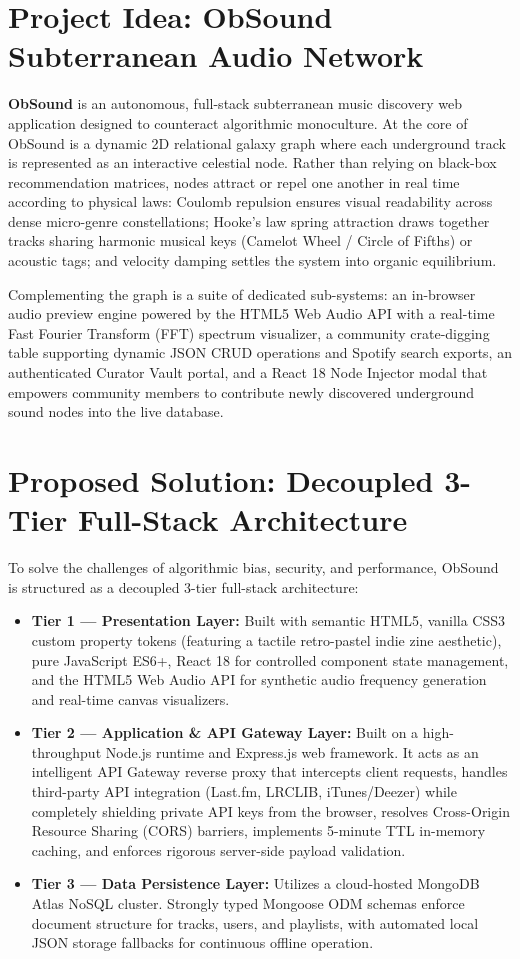 \documentclass[12pt,a4paper,oneside]{report}
\begin{document}
\section{Project Idea: ObSound Subterranean Audio Network}
\textbf{ObSound} is an autonomous, full-stack subterranean music discovery web application designed to counteract algorithmic monoculture. At the core of ObSound is a dynamic 2D relational galaxy graph where each underground track is represented as an interactive celestial node. Rather than relying on black-box recommendation matrices, nodes attract or repel one another in real time according to physical laws: Coulomb repulsion ensures visual readability across dense micro-genre constellations; Hooke's law spring attraction draws together tracks sharing harmonic musical keys (Camelot Wheel / Circle of Fifths) or acoustic tags; and velocity damping settles the system into organic equilibrium.

Complementing the graph is a suite of dedicated sub-systems: an in-browser audio preview engine powered by the HTML5 Web Audio API with a real-time Fast Fourier Transform (FFT) spectrum visualizer, a community crate-digging table supporting dynamic JSON CRUD operations and Spotify search exports, an authenticated Curator Vault portal, and a React 18 Node Injector modal that empowers community members to contribute newly discovered underground sound nodes into the live database.

\section{Proposed Solution: Decoupled 3-Tier Full-Stack Architecture}
To solve the challenges of algorithmic bias, security, and performance, ObSound is structured as a decoupled 3-tier full-stack architecture:
\begin{itemize}
    \item \textbf{Tier 1 --- Presentation Layer:} Built with semantic HTML5, vanilla CSS3 custom property tokens (featuring a tactile retro-pastel indie zine aesthetic), pure JavaScript ES6+, React 18 for controlled component state management, and the HTML5 Web Audio API for synthetic audio frequency generation and real-time canvas visualizers.
    \item \textbf{Tier 2 --- Application \& API Gateway Layer:} Built on a high-throughput Node.js runtime and Express.js web framework. It acts as an intelligent API Gateway reverse proxy that intercepts client requests, handles third-party API integration (Last.fm, LRCLIB, iTunes/Deezer) while completely shielding private API keys from the browser, resolves Cross-Origin Resource Sharing (CORS) barriers, implements 5-minute TTL in-memory caching, and enforces rigorous server-side payload validation.
    \item \textbf{Tier 3 --- Data Persistence Layer:} Utilizes a cloud-hosted MongoDB Atlas NoSQL cluster. Strongly typed Mongoose ODM schemas enforce document structure for tracks, users, and playlists, with automated local JSON storage fallbacks for continuous offline operation.
\end{itemize}
\end{document}
